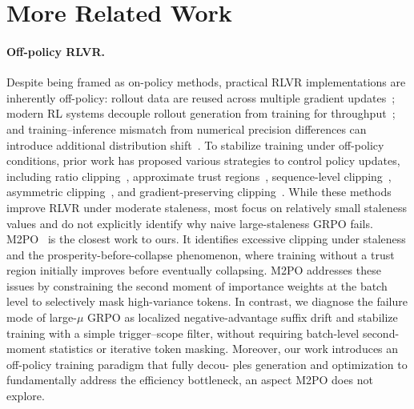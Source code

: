 \section{More Related Work}
\label{app:more_related_work}

\paragraph{Off-policy RLVR.}
Despite being framed as on-policy methods, practical RLVR implementations are
inherently off-policy: rollout data are reused across multiple gradient
updates~\citep{shao2024deepseekmathpushinglimitsmathematical,
huggingface_openr1_update3}; modern RL systems decouple rollout generation from
training for throughput~\citep{fu2025areal, slime_github,
noukhovitch2024asynchronous, zhong2025streamrl, he2025history}; and
training--inference mismatch from numerical precision differences can introduce
additional distribution shift~\citep{qi2025defeating}. To stabilize training
under off-policy conditions, prior work has proposed various strategies to
control policy updates, including ratio clipping~\citep{yu2025dapoopensourcellmreinforcement},
approximate trust regions~\citep{fu2025areal}, sequence-level
clipping~\citep{zheng2025group}, asymmetric clipping~\citep{roux2025tapered,
arnal2025asymmetric}, and gradient-preserving clipping~\citep{su2025klear,
chen2025minimax}. While these methods improve RLVR under moderate staleness, most focus on
relatively small staleness values and do not explicitly identify why naive
large-staleness GRPO fails. M2PO~\citep{zheng2025prosperitycollapsefaroffpolicy}
is the closest work to ours. It identifies excessive clipping under staleness and
the prosperity-before-collapse phenomenon, where training without a trust region
initially improves before eventually collapsing. M2PO addresses these issues by
constraining the second moment of importance weights at the batch level to
selectively mask high-variance tokens. In contrast, we diagnose the failure mode
of large-$\mu$ GRPO as localized negative-advantage suffix drift and stabilize
training with a simple trigger--scope filter, without requiring batch-level
second-moment statistics or iterative token masking. Moreover, our work
introduces an off-policy training paradigm that fully decou-
ples generation and optimization to fundamentally address
the efficiency bottleneck, an aspect M2PO does not explore.

